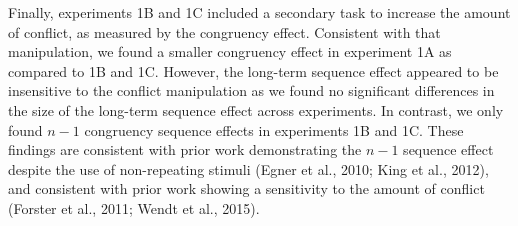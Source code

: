 \documentclass[]{DissertateCUNY}
\begin{document}
Finally, experiments 1B and 1C included a secondary task to increase the
amount of conflict, as measured by the congruency effect. Consistent
with that manipulation, we found a smaller congruency effect in
experiment 1A as compared to 1B and 1C. However, the long-term sequence
effect appeared to be insensitive to the conflict manipulation as we
found no significant differences in the size of the long-term sequence
effect across experiments. In contrast, we only found \(n-1\) congruency
sequence effects in experiments 1B and 1C. These findings are consistent
with prior work demonstrating the \(n-1\) sequence effect despite the
use of non-repeating stimuli (Egner et al., 2010; King et al., 2012),
and consistent with prior work showing a sensitivity to the amount of
conflict (Forster et al., 2011; Wendt et al., 2015).
\end{document}
